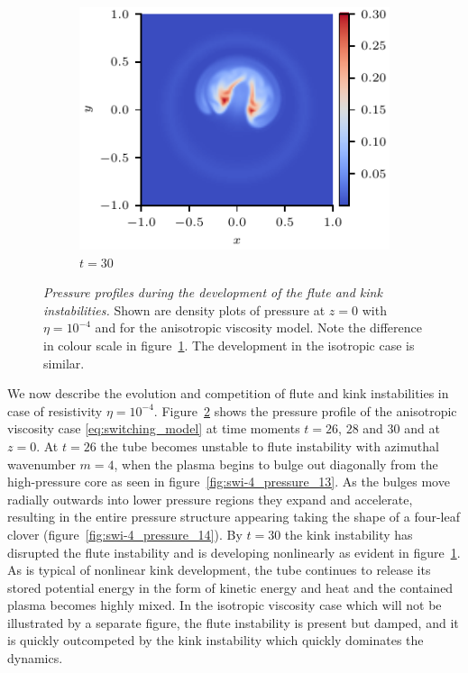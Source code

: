\documentclass[fleqn,usenatbib]{mnras}
\newcommand{\rs}[2]{{#2}}
\newcommand{\mycaption}[2]{\caption[#1]{\emph{#1} #2}}
\begin{document}
\begin{figure}
\begin{subfigure}{0.32\textwidth}
      \includegraphics[width=\linewidth]{swi-4_pressure_15.pdf}
      \caption{$t=30$}
      \label{fig:swi-4_pressure_15}
    \end{subfigure}
\mycaption{Pressure profiles during the development of the
  flute and kink instabilities.}{Shown are
  \rs{slices}{density plots} of pressure \rs{through}{at} $z=0$
  \rs{where}{with} $\eta = 10^{-4}$ 
  and \rs{the viscosity model is \rs{switching}{anisotropic}}{for the
    anisotropic viscosity model}. Note the difference in colour scale
  in figure~\ref{fig:swi-4_pressure_15}. The development in the
  isotropic case is similar.} 
\label{fig:kink_pressure_slices-4}%
\end{figure}

\rs{}{We now describe the evolution and competition of flute and
  kink instabilities in case of resistivity $\eta=10^{-4}$.}
\rs{The}{Figure}~\ref{fig:kink_pressure_slices-4} shows the pressure profile
\rs{the viscosity model is switching for times}{of the \rs{switching}{anisotropic} viscosity case 
\eqref{eq:switching_model} at
time moments} $t=26$, $28$ and $30$ and \rs{through}{at} $z=0$. At $t=26$
the tube becomes unstable to \rs{the $m=4$}{} flute
instability \rs{}{with azimuthal wavenumber $m=4$}, when the
plasma begins to \rs{(slightly)}{} bulge out diagonally from the
high-pressure core as seen in figure~\ref{fig:swi-4_pressure_13}. As  
the bulges move radially outwards into lower pressure regions they
expand and accelerate, resulting in the entire pressure structure
appearing \rs{clover-shaped}{taking the shape of a four-leaf clover} (figure~\ref{fig:swi-4_pressure_14}). By
$t=30$ the kink instability has disrupted the flute
instability and is developing nonlinearly
\rs{}{as evident in} figure~\ref{fig:swi-4_pressure_15}. As is typical of nonlinear kink
development, the tube continues to release its stored potential energy
\rs{as}{in the form of} kinetic energy and heat and the contained plasma becomes highly
mixed. In the \rs{unseen}{} isotropic \rs{}{viscosity} case
\rs{}{which will not be illustrated by a separate figure}, the
flute instability is present but damped, and \rs{}{it is
  quickly outcompeted by} the kink instability \rs{}{which} quickly dominates the dynamics. 
\end{document}
